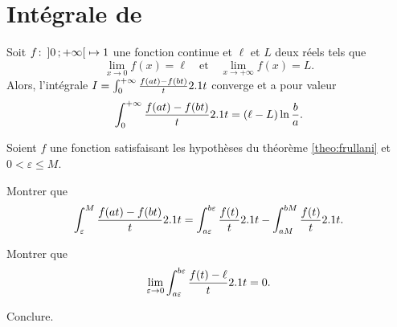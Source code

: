 \section{Intégrale de }





\begin{theo}\label{theo:frullani}
Soit $\fonctionligne[f]{\interoo{0}{+\infty}}{\R}$ une fonction continue et $\ell$ et $L$ deux réels tels que
\[
\lim_{x\to0} f(x) = \ell
\quad \text{et} \quad 
\lim_{x\to+\infty} f(x) = L.
\]
Alors, l'intégrale $I = \int_0^{+\infty} \frac{f(a t) - f(b t)}{t} \d t$ converge et a pour valeur
\[
\int_0^{+\infty} \frac{f(a t) - f(b t)}{t} \d t = (\ell - L) \ln\frac{b}{a}.
\]
\end{theo}

\begin{exercice}
Soient $f$ une fonction satisfaisant les hypothèses du théorème \ref{theo:frullani} et $0 < \varepsilon \leqslant M$.
\begin{questions}
\item Montrer que
\[
\int_\varepsilon^M \frac{f(a t) - f(b t)}{t} \d t
= \int_{a\varepsilon}^{b\varepsilon} \frac{f(t)}{t} \d t - \int_{a M}^{b M} \frac{f(t)}{t} \d t.
\]

\item Montrer que
\[
\lim_{\varepsilon \to 0} \int_{a\varepsilon}^{b\varepsilon} \frac{f(t) - \ell}{t} \d t = 0.
\]

\item Conclure.
\end{questions}
\end{exercice}

